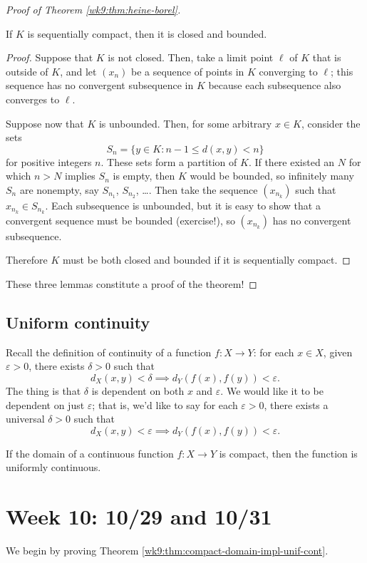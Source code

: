 \documentclass[10pt]{scrartcl}
\providecommand{\eps}{\varepsilon}
\begin{document}
\begin{proof}[Proof of Theorem \ref{wk9:thm:heine-borel}]
	\begin{lemma}
		If $K$ is sequentially compact, then it is closed and bounded.
	\end{lemma}
	\begin{proof}
		Suppose that $K$ is not closed.
		Then, take a limit point $\ell$ of $K$ that is outside of $K$,
		and let $(x_n)$ be a sequence of points in $K$ converging to $\ell$;
		this sequence has no convergent subsequence in $K$
		because each subsequence also converges to $\ell$.
		
		Suppose now that $K$ is unbounded.
		Then, for some arbitrary $x\in K$, consider the sets
		\[S_n = \{y\in K : n-1\le d(x, y) < n\}\]
		for positive integers $n$.
		These sets form a partition of $K$.
		If there existed an $N$ for which $n > N$ implies $S_n$ is empty,
		then $K$ would be bounded, so infinitely many $S_n$ are nonempty,
		say $S_{n_1}$, $S_{n_2}$, \dots. Then take the sequence $(x_{n_k})$
		such that $x_{n_k}\in S_{n_k}$. Each subsequence is unbounded,
		but it is easy to show that a convergent sequence must be bounded
		(exercise!), so $(x_{n_k})$ has no convergent subsequence.
		
		Therefore $K$ must be both closed and bounded
		if it is sequentially compact.
	\end{proof}

	These three lemmas constitute a proof of the theorem!
\end{proof}

\subsection{Uniform continuity}
Recall the definition of continuity of a function $f\colon X\to Y$:
for each $x\in X$, given $\eps > 0$, there exists $\delta > 0$ such that
\[d_X(x, y) < \delta \implies d_Y(f(x), f(y)) < \eps.\]
The thing is that $\delta$ is dependent on both $x$ and $\eps$.
We would like it to be dependent on just $\eps$; that is, we'd like to say
for each $\eps > 0$, there exists a universal $\delta > 0$ such that
\[d_X(x, y) < \eps \implies d_Y(f(x), f(y)) < \eps.\]

\begin{theorem}\label{wk9:thm:compact-domain-impl-unif-cont}
	If the domain of a continuous function $f\colon X\to Y$ is compact,
	then the function is uniformly continuous.
\end{theorem}

\pagebreak
\section{Week 10: 10/29 and 10/31}
We begin by proving Theorem \ref{wk9:thm:compact-domain-impl-unif-cont}.
\end{document}
